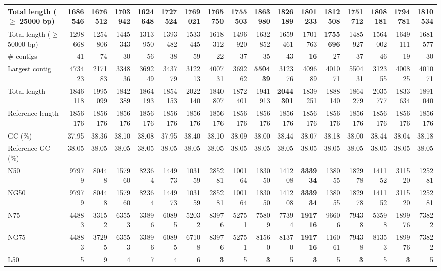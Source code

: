 \documentclass[12pt,a4paper]{article}
\begin{document}
\begin{table}[ht]
\begin{center}
\begin{tabular}{|l*{16}{|r}|}
Total length ($\geq$ 25000 bp) & 1686546 & 1676512 & 1703942 & 1624648 & 1727524 & 1769021 & 1765750 & 1755503 & {\bf 1863980} & 1826189 & 1801233 & 1812508 & 1751712 & 1808181 & 1794781 & 1810534 \\ \hline
Total length ($\geq$ 50000 bp) & 1298668 & 1254806 & 1445343 & 1313950 & 1393482 & 1533445 & 1618312 & 1496920 & 1632852 & 1659461 & 1701763 & {\bf 1755696} & 1485927 & 1564002 & 1649111 & 1681577 \\ \hline
\# contigs & 41 & 74 & 30 & 56 & 38 & 59 & 22 & 37 & 35 & 43 & {\bf 16} & 27 & 37 & 46 & 19 & 30 \\ \hline
Largest contig & 473423 & 217183 & 334836 & 369249 & 343779 & 312213 & 400731 & 369262 & {\bf 550439} & 312376 & 409689 & 401071 & 550431 & 312355 & 400825 & 401071 \\ \hline
Total length & 1846118 & 1995099 & 1842389 & 1864193 & 1854153 & 2022140 & 1840807 & 1872401 & 1941913 & {\bf 2044301} & 1839251 & 1888140 & 1864279 & 2035777 & 1833634 & 1891040 \\ \hline
Reference length & 1856176 & 1856176 & 1856176 & 1856176 & 1856176 & 1856176 & 1856176 & 1856176 & 1856176 & 1856176 & 1856176 & 1856176 & 1856176 & 1856176 & 1856176 & 1856176 \\ \hline
GC (\%) & 37.95 & 38.36 & 38.10 & 38.08 & 37.95 & 38.40 & 38.10 & 38.09 & 38.00 & 38.44 & 38.07 & 38.18 & 38.00 & 38.44 & 38.04 & 38.18 \\ \hline
Reference GC (\%) & 38.05 & 38.05 & 38.05 & 38.05 & 38.05 & 38.05 & 38.05 & 38.05 & 38.05 & 38.05 & 38.05 & 38.05 & 38.05 & 38.05 & 38.05 & 38.05 \\ \hline
N50 & 97979 & 80448 & 157960 & 82364 & 144973 & 103159 & 285281 & 100164 & 183050 & 141208 & {\bf 333934} & 138055 & 182978 & 141152 & 311520 & 125281 \\ \hline
NG50 & 97979 & 80448 & 157960 & 82364 & 144973 & 103159 & 285281 & 100164 & 183050 & 141208 & {\bf 333934} & 138055 & 182978 & 141152 & 311520 & 125281 \\ \hline
N75 & 44883 & 33152 & 63553 & 33896 & 60895 & 52032 & 83976 & 52751 & 75809 & 77394 & {\bf 191716} & 96606 & 79438 & 53598 & 189976 & 73822 \\ \hline
NG75 & 44883 & 37295 & 63553 & 33896 & 60895 & 67108 & 83976 & 52751 & 81560 & 81370 & {\bf 191716} & 116061 & 79438 & 81353 & 189976 & 73822 \\ \hline
L50 & 5 & 9 & 4 & 7 & 4 & 6 & {\bf 3} & 5 & {\bf 3} & 5 & {\bf 3} & 5 & {\bf 3} & 5 & {\bf 3} & 5 \\ \hline

\end{tabular}
\end{center}
\end{table}
\end{document}
